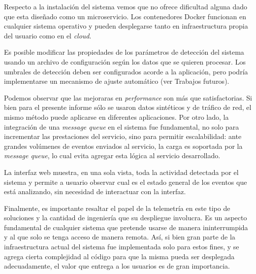 \documentclass[a4paper,10pt, oneside]{article}
\begin{document}
Respecto a la instalación del sistema vemos que no ofrece dificultad alguna dado que esta diseñado como un microservicio. Los contenedores Docker funcionan en cualquier sistema operativo y pueden desplegarse tanto en infraestructura propia del usuario como en el \textit{cloud}.

Es posible modificar las propiedades de los parámetros de detección del sistema usando un archivo de configuración según los datos que se quieren procesar. Los umbrales de detección deben ser configurados acorde a la aplicación, pero podría implementarse un mecanismo de ajuste automático (ver Trabajos futuros).

Podemos observar que las mejoraras en \textit{performance} son más que satisfactorias. Si bien para el presente informe sólo se usaron datos sintéticos y de tráfico de red, el mismo método puede aplicarse en diferentes aplicaciones. Por otro lado, la integración de una \textit{message queue} en el sistema fue fundamental, no solo para incrementar las prestaciones del servicio, sino para permitir escalabilidad: ante grandes volúmenes de eventos enviados al servicio, la carga es soportada por la \textit{message queue}, lo cual evita agregar esta lógica al servicio desarrollado.

La interfaz web muestra, en una sola vista, toda la actividad detectada por el sistema y permite a usuario observar cual es el estado 
general de los eventos que está analizando, sin necesidad de interactuar con la interfaz.

Finalmente, es importante resaltar el papel de la telemetría en este tipo de soluciones y la cantidad de ingeniería que su despliegue involucra. Es un aspecto fundamental de cualquier sistema que pretende usarse de manera ininterrumpida y al que solo se tenga acceso de manera remota. Así, si bien gran parte de la infraestructura actual del sistema fue implementada solo para estos fines, y se agrega cierta complejidad al código para que la misma pueda ser desplegada adecuadamente, el valor que entrega a los usuarios es de gran importancia.

\clearpage
\end{document}

